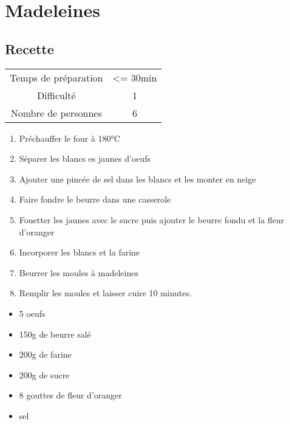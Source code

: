 \newpage
\section{Madeleines}
    \label{sec:Madeleines}
    \subsection{Recette}
    \vspace{1cm}


    \begin{center}
        \begin{tabular}{c|c}
            Temps de préparation & <= 30min \\
            Difficulté & 1 \\
            Nombre de personnes & 6 
        \end{tabular}
    \end{center}{}

    \vspace{1cm}
    \hline
    \vspace{1cm}

    \begin{minipage}{.7\textwidth}
        \begin{enumerate}
            \item Préchauffer le four à 180°C
	    \item Séparer les blancs es jaunes d'oeufs
	    \item Ajouter une pincée de sel dans les blancs et les monter en neige
	    \item Faire fondre le beurre dans une casserole
	    \item Fouetter les jaunes avec le sucre puis ajouter le beurre fondu et la fleur d'oranger
	    \item Incorporer les blancs et la farine
	    \item Beurrer les moules à madeleines
	    \item Remplir les moules et laisser cuire 10 minutes.

        \end{enumerate}
    \end{minipage}
    \begin{minipage}{.3\textwidth}
        \begin{flushleft}
        \begin{itemize}
            \item 5 oeufs
	    \item 150g de beurre salé
	    \item 200g de farine
	    \item 200g de sucre
	    \item 8 gouttes de fleur d'oranger
	    \item sel

        \end{itemize}
        \end{flushleft}
    \end{minipage}
    
